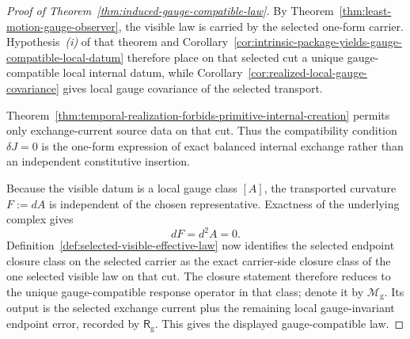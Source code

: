 \begin{proof}[Proof of Theorem~\ref{thm:induced-gauge-compatible-law}]
\label{proof:thm:induced-gauge-compatible-law}
By Theorem~\ref{thm:least-motion-gauge-observer}, the visible law is carried by
the selected one-form carrier. Hypothesis~\emph{(i)} of that theorem and
Corollary~\ref{cor:intrinsic-package-yields-gauge-compatible-local-datum}
therefore place on that selected cut a unique gauge-compatible local internal
datum, while Corollary~\ref{cor:realized-local-gauge-covariance} gives local
gauge covariance of the selected transport.

Theorem~\ref{thm:temporal-realization-forbids-primitive-internal-creation}
permits only exchange-current source data on that cut. Thus the
compatibility condition \(\delta J=0\) is the one-form expression of exact
balanced internal exchange rather than an independent constitutive insertion.

Because the visible datum is a local gauge class \([A]\), the transported
curvature \(F:=dA\) is independent of the chosen representative. Exactness of
the underlying complex gives
\[
dF=d^2A=0.
\]
Definition~\ref{def:selected-visible-effective-law} now identifies the
selected endpoint closure class on the selected carrier as the exact
carrier-side closure class of the one selected visible law on that cut. The
closure statement therefore reduces to the unique
gauge-compatible response operator in that class; denote it by
\(\mathcal M_{\mathrm g}\). Its output is the selected exchange current plus the
remaining local gauge-invariant endpoint error, recorded by
\(\mathsf R_{\mathrm g}\). This gives the displayed gauge-compatible law.
\end{proof}

